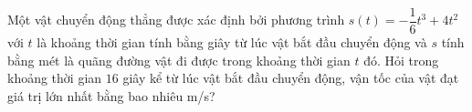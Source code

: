 \begin{bt}%
	Một vật chuyển động thẳng được xác định bởi phương trình $s(t)=-\dfrac{1}{6}  t^3+4 t^2$ với $t$ là khoảng thời gian tính bằng giây từ lúc vật bắt đầu chuyển động và $s$ tính bằng mét là quãng đường vật đi được trong khoảng thời gian $t$ đó. Hỏi trong khoảng thời gian $16$ giây kể từ lúc vật bắt đầu chuyển động, vận tốc của vật đạt giá trị lớn nhất bằng bao nhiêu m/s?
\end{bt}

